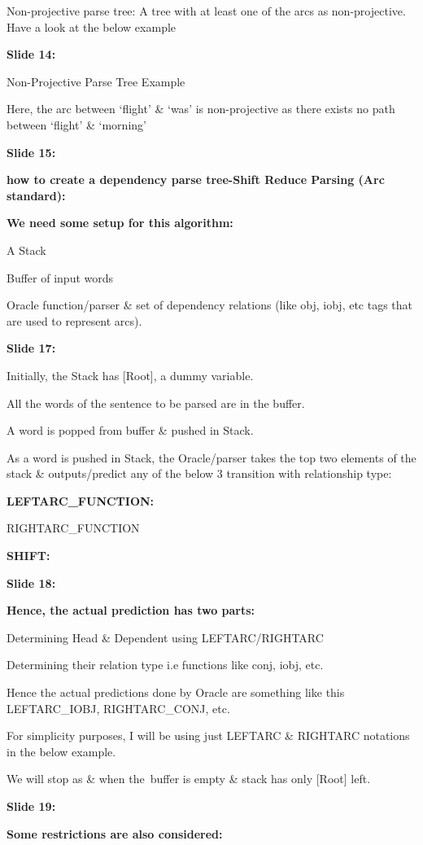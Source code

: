 \documentclass[11pt,a4paper]{article}
\begin{document}
Non-projective parse tree: A tree with at least one of the arcs as non-projective. Have a look at the below example

\textbf{Slide 14:}

Non-Projective Parse Tree Example

Here, the arc between ‘flight’ & ‘was’ is non-projective as there exists no path between ‘flight’ & ‘morning’

\textbf{Slide 15:}

\textbf{how to create a dependency parse tree-Shift Reduce Parsing (Arc standard):} 

\textbf{We need some setup for this algorithm:} 

A Stack

Buffer of input words

Oracle function/parser & set of dependency relations (like obj, iobj, etc tags that are used to represent arcs).

\textbf{Slide 17:}

Initially, the Stack has [Root], a dummy variable.

All the words of the sentence to be parsed are in the buffer.

A word is popped from buffer & pushed in Stack.

As a word is pushed in Stack, the Oracle/parser takes the top two elements of the stack & outputs/predict any of the below 3 transition with relationship type:

\textbf{LEFTARC\_FUNCTION:} 

RIGHTARC\_FUNCTION

\textbf{SHIFT:} 

\textbf{Slide 18:}

\textbf{Hence, the actual prediction has two parts:} 

Determining Head & Dependent using LEFTARC/RIGHTARC

Determining their relation type i.e functions like conj, iobj, etc.

Hence the actual predictions done by Oracle are something like this LEFTARC\_IOBJ, RIGHTARC\_CONJ, etc.

For simplicity purposes, I will be using just LEFTARC & RIGHTARC notations in the below example.

We will stop as & when the buffer is empty & stack has only [Root] left.

\textbf{Slide 19:}

\textbf{Some restrictions are also considered:} 
\end{document}
